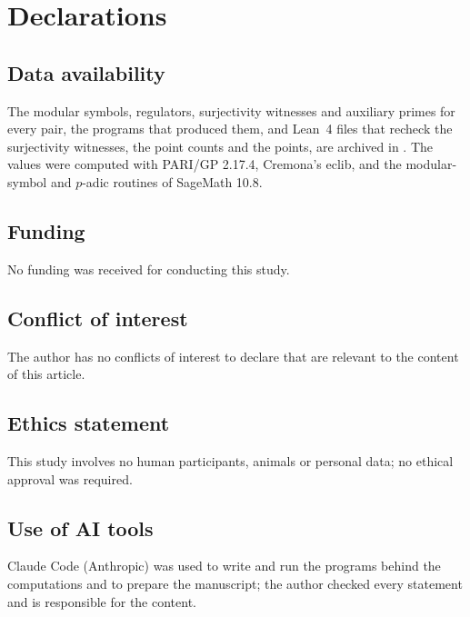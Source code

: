 \documentclass[11pt]{amsart}
\theoremstyle{definition}
\begin{document}
\FloatBarrier

\section*{Declarations}

\subsection*{Data availability}
The modular symbols, regulators, surjectivity witnesses and auxiliary primes for every pair, the programs that produced them, and Lean~4 files that recheck the surjectivity witnesses, the point counts and the points, are archived in \cite{Archive}. The values were computed with PARI/GP 2.17.4, Cremona's eclib, and the modular-symbol and $p$-adic routines of SageMath 10.8.

\subsection*{Funding}
No funding was received for conducting this study.

\subsection*{Conflict of interest}
The author has no conflicts of interest to declare that are relevant to the content of this article.

\subsection*{Ethics statement}
This study involves no human participants, animals or personal data; no ethical approval was required.

\subsection*{Use of AI tools}
Claude Code (Anthropic) was used to write and run the programs behind the computations and to prepare the manuscript; the author checked every statement and is responsible for the content.
\end{document}
